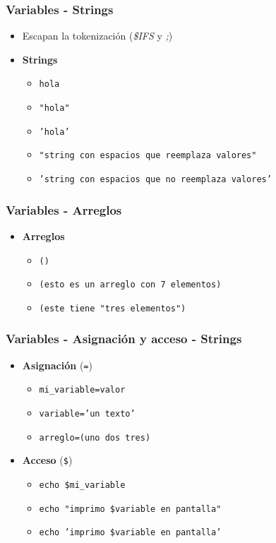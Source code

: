 \begin{frame}
  \frametitle{Variables - Strings}
  \begin{itemize}
    \item Escapan la tokenización (\textit{\$IFS} y \textit{;})
    \item \textbf{Strings}
    \begin{itemize}
      \item \texttt{hola}
      \item \texttt{\string"hola\string"}
      \item \texttt{\string'hola\string'}
      \item \texttt{\string"string con espacios que reemplaza valores\string"}
      \item \texttt{\string'string con espacios que no reemplaza valores\string'}
    \end{itemize}
  \end{itemize}
\end{frame}

\begin{frame}
  \frametitle{Variables - Arreglos}
  \begin{itemize}
    \item \textbf{Arreglos}
    \begin{itemize}
      \item \texttt{()}
      \item \texttt{(esto es un arreglo con 7 elementos)}
      \item \texttt{(este tiene \string"tres elementos\string")}
    \end{itemize}
  \end{itemize}
\end{frame}

\begin{frame}
  \frametitle{Variables - Asignación y acceso - Strings}
  \begin{itemize}
    \item \textbf{Asignación} (\texttt{=})
    \begin{itemize}
      \item \texttt{mi\_variable=valor}
      \item \texttt{variable=\string'un texto\string'}
      \item \texttt{arreglo=(uno dos tres)}
    \end{itemize}
    \item \textbf{Acceso} (\texttt{\${}})
    \begin{itemize}
      \item \texttt{echo \$mi\_variable}
      \item \texttt{echo \string"imprimo \$variable en pantalla\string"}
      \item \texttt{echo \string'imprimo \$variable en pantalla\string'}
    \end{itemize}
  \end{itemize}
\end{frame}

